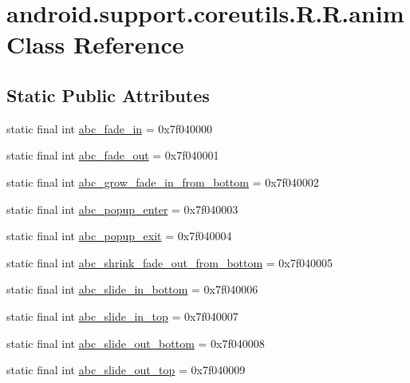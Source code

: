 \hypertarget{classandroid_1_1support_1_1coreutils_1_1_r_1_1anim}{
\section{android.support.coreutils.R.R.anim Class Reference}
\label{classandroid_1_1support_1_1coreutils_1_1_r_1_1anim}
}
\subsection*{Static Public Attributes}
\begin{CompactItemize}
\item 
static final int \hyperlink{classandroid_1_1support_1_1coreutils_1_1_r_1_1anim_4c64d7d06c6244665bb049d0cdca2101}{abc\_\-fade\_\-in} = 0x7f040000
\item 
static final int \hyperlink{classandroid_1_1support_1_1coreutils_1_1_r_1_1anim_5564af8fb356892c2aee99588c59ba94}{abc\_\-fade\_\-out} = 0x7f040001
\item 
static final int \hyperlink{classandroid_1_1support_1_1coreutils_1_1_r_1_1anim_3c48b130a672cd838244a9d54845a70b}{abc\_\-grow\_\-fade\_\-in\_\-from\_\-bottom} = 0x7f040002
\item 
static final int \hyperlink{classandroid_1_1support_1_1coreutils_1_1_r_1_1anim_a6a36145bf6919ba28d64063a220b549}{abc\_\-popup\_\-enter} = 0x7f040003
\item 
static final int \hyperlink{classandroid_1_1support_1_1coreutils_1_1_r_1_1anim_f9044545dade5538252994411c5a9369}{abc\_\-popup\_\-exit} = 0x7f040004
\item 
static final int \hyperlink{classandroid_1_1support_1_1coreutils_1_1_r_1_1anim_736d7b795462b3f22372909b09d89f5f}{abc\_\-shrink\_\-fade\_\-out\_\-from\_\-bottom} = 0x7f040005
\item 
static final int \hyperlink{classandroid_1_1support_1_1coreutils_1_1_r_1_1anim_1a46f620a5ffb0bafd3982e6f30f99d5}{abc\_\-slide\_\-in\_\-bottom} = 0x7f040006
\item 
static final int \hyperlink{classandroid_1_1support_1_1coreutils_1_1_r_1_1anim_697247810558ebbfe68cbca9a7c0f3fc}{abc\_\-slide\_\-in\_\-top} = 0x7f040007
\item 
static final int \hyperlink{classandroid_1_1support_1_1coreutils_1_1_r_1_1anim_f98339e3c72b63e8fd1ec39a419e2d89}{abc\_\-slide\_\-out\_\-bottom} = 0x7f040008
\item 
static final int \hyperlink{classandroid_1_1support_1_1coreutils_1_1_r_1_1anim_d3cdc9ec050bcf6082d03f8b56b5b7b5}{abc\_\-slide\_\-out\_\-top} = 0x7f040009

\end{CompactItemize}

